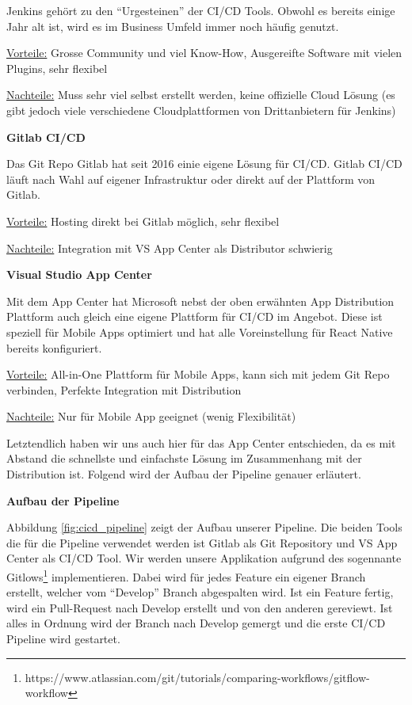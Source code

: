 Jenkins gehört zu den ``Urgesteinen'' der CI/CD Tools. Obwohl es bereits einige Jahr alt ist, wird es im Business Umfeld immer noch häufig genutzt. 

\underline{Vorteile:} Grosse Community und viel Know-How, Ausgereifte Software mit vielen Plugins, sehr flexibel

\underline{Nachteile:} Muss sehr viel selbst erstellt werden, keine offizielle Cloud Lösung (es gibt jedoch viele verschiedene Cloudplattformen von Drittanbietern für Jenkins)

\textbf{Gitlab CI/CD}

Das Git Repo Gitlab hat seit 2016 einie eigene Lösung für CI/CD. Gitlab CI/CD läuft nach Wahl auf eigener Infrastruktur oder direkt auf der Plattform von Gitlab. 

\underline{Vorteile:} Hosting direkt bei Gitlab möglich, sehr flexibel

\underline{Nachteile:} Integration mit VS App Center als Distributor schwierig

\textbf{Visual Studio App Center} 

Mit dem App Center hat Microsoft nebst der oben erwähnten App Distribution Plattform auch gleich eine eigene Plattform für CI/CD im Angebot. Diese ist speziell für Mobile Apps optimiert und hat alle Voreinstellung für React Native bereits konfiguriert.

\underline{Vorteile:} All-in-One Plattform für Mobile Apps, kann sich mit jedem Git Repo verbinden, Perfekte Integration mit Distribution

\underline{Nachteile:} Nur für Mobile App geeignet (wenig Flexibilität)

Letztendlich haben wir uns auch hier für das App Center entschieden, da es mit Abstand die schnellste und einfachste Lösung im Zusammenhang mit der Distribution ist. Folgend wird der Aufbau der Pipeline genauer erläutert.

\textbf{Aufbau der Pipeline}

Abbildung \ref{fig:cicd_pipeline} zeigt der Aufbau unserer Pipeline. Die beiden Tools die für die Pipeline verwendet werden ist Gitlab als Git Repository und VS App Center als CI/CD Tool.
Wir werden unsere Applikation aufgrund des sogennante Gitlows\footnote{https://www.atlassian.com/git/tutorials/comparing-workflows/gitflow-workflow} implementieren. Dabei wird für jedes Feature ein eigener Branch erstellt, welcher vom ``Develop'' Branch abgespalten wird. Ist ein Feature fertig, wird ein Pull-Request nach Develop erstellt und von den anderen gereviewt. Ist alles in Ordnung wird der Branch nach Develop gemergt und die erste CI/CD Pipeline wird gestartet. 

